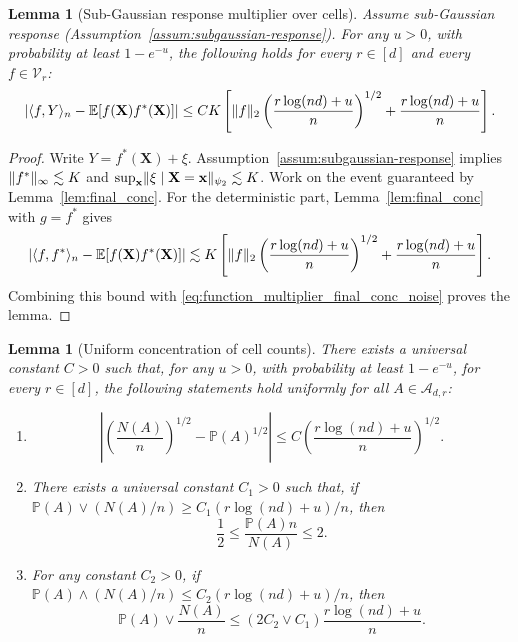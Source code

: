 \documentclass[11pt]{article}
\theoremstyle{plain}
\newtheorem{lemma}[theorem]{Lemma}
\theoremstyle{definition}
\theoremstyle{remark}
\theoremstyle{plain}
\newcommand{\bx}{\mathbf{x}}
\newcommand{\bX}{\mathbf{X}}
\DeclarePairedDelimiter{\abs}{|}{|}
\DeclarePairedDelimiter{\sgnorm}{\|}{\|_{\psi_2}}
\DeclarePairedDelimiter{\norm}{\|}{\|}
\DeclarePairedDelimiter{\inprod}{\langle}{\rangle}
\renewcommand{\P}{\mathbb{P}}
\newcommand{\E}{\mathbb{E}}
\newcommand{\partfunc}{\mathcal{V}}
\newcommand{\1}{\mathbbm{1}}
\begin{document}
\begin{lemma}[Sub-Gaussian response multiplier over cells]\label{lem:subg_response_multiplier_cells}
Assume sub-Gaussian response (Assumption~\ref{assum:subgaussian-response}).
For any $u>0$, with probability at least $1-e^{-u}$, the following holds for every $r\in[d]$ and every $f\in\partfunc_r$:
\begin{equation}\label{eq:subg-response-multiplier-cells}
\abs*{\inprod{f,Y}_n-\E[f(\bX)f^*(\bX)]}
\leq
C K
\left[
\norm{f}_2\left(\frac{r\log(nd)+u}{n}\right)^{1/2}
+
\frac{r\log(nd)+u}{n}
\right].
\end{equation}
\end{lemma}

\begin{proof}
Write $Y=f^*(\bX)+\xi$.
Assumption~\ref{assum:subgaussian-response} implies
$\norm{f^*}_\infty\lesssim K$ and
$\sup_{\bx}\sgnorm{\xi\mid \bX=\bx}\lesssim K$.
Work on the event guaranteed by Lemma~\ref{lem:final_conc}.
For the deterministic part, Lemma~\ref{lem:final_conc} with $g=f^*$
gives
\[
\abs*{\inprod{f,f^*}_n-\E[f(\bX)f^*(\bX)]}
\lesssim
K\left[
\norm{f}_2\left(\frac{r\log(nd)+u}{n}\right)^{1/2}
+
\frac{r\log(nd)+u}{n}
\right].
\]
Combining this bound with
\eqref{eq:function_multiplier_final_conc_noise} proves the lemma.
\end{proof}


\begin{lemma}[Uniform concentration of cell counts]
\label{lemma:uniform_cell_count}
There exists a universal constant $C>0$ such that, for any $u>0$, with probability at least $1-e^{-u}$, for every $r\in [d]$, the following statements hold uniformly for all $A\in\mathcal A_{d,r}$:
\begin{enumerate}
\item
\begin{equation}
\label{eq:cell-conc-1}
\left|
\left(\frac{N(A)}{n}\right)^{1/2}
-\P(A)^{1/2}
\right|
\leq
C
\left(\frac{r\log(nd)+u}{n}\right)^{1/2}.
\end{equation}
\item There exists a universal constant $C_1>0$ such that, if $\P(A)\vee (N(A)/n)\geq C_1(r\log(nd)+u)/n$, then
\begin{equation}
\label{eq:cell-conc-2}
\frac{1}{2}\leq \frac{\P(A)n}{N(A)}\leq 2.
\end{equation}
\item For any constant $C_2>0$, if $\P(A)\wedge (N(A)/n)\leq C_2(r\log(nd)+u)/n$, then
\begin{equation}
\label{eq:cell-conc-3}
\P(A)\vee\frac{N(A)}{n}
\leq
(2C_2\vee C_1)\frac{r\log(nd)+u}{n}.
\end{equation}
\end{enumerate}
\end{lemma}
\end{document}
